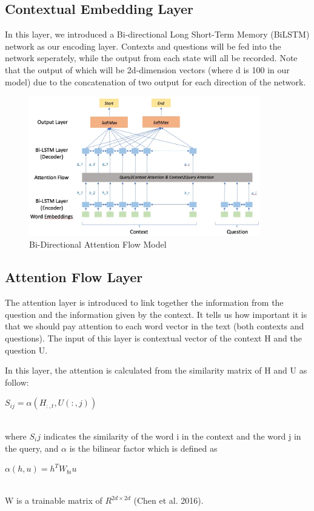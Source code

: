 \documentclass{article} %
\begin{document}
\subsection{Contextual Embedding Layer}

In this layer, we introduced a Bi-directional Long Short-Term Memory (BiLSTM) network as our encoding layer. Contexts and questions will be fed into the network seperately, while the output from each state will all be recorded. Note that the output of which will be 2d-dimension vectors (where d is 100 in our model) due to the concatenation of two output for each direction of the network.

\begin{figure}[h]
\begin{center}
\includegraphics[width=0.9\textwidth]{model_graph.jpeg}
\end{center}
\caption{Bi-Directional Attention Flow Model }
\end{figure}

\subsection{Attention Flow Layer}

The attention layer is introduced to link together the information from the question and the information given by the context. It tells us how important it is that we should pay attention to each word vector in the text (both contexts and questions). The input of this layer is contextual vector of the context H and the question U.

In this layer, the attention is calculated from the similarity matrix of H and U as follow:\\
\newline
\centerline{$S_{ij}=\alpha (H_{:,t}, U(:,j))$}\\
\newline
where $S_ij$ indicates the similarity of the word i in the context and the word j in the query, and $\alpha$ is the bilinear factor which is defined as\\
\newline
\centerline{$\alpha (h,u)=h^TW_{bi}u$}\\
\newline
W is a trainable matrix of $R^{2d\times 2d}$ (Chen et al. 2016).
\end{document}
